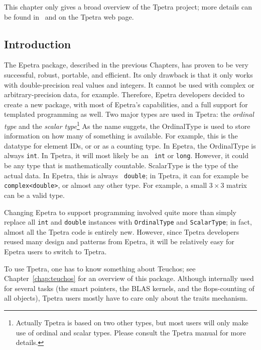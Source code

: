 This chapter only gives a broad overview of the Tpetra project; more details
can be found in~\cite{tpetra_overview} and on the Tpetra web page.

\subsection{Introduction}
\label{sec:tpetra_introduction}

The Epetra package, described in the previous Chapters, has proven to be very
successful, robust, portable, and efficient. Its only drawback is that it only
works with double-precision real values and integers. It cannot be used with
complex or arbitrary-precision data, for example. Therefore, Epetra developers
decided to create a new package, with most of Epetra's capabilities, and a
full support for templated programming as well. Two major types are used in
Tpetra: the {\sl ordinal type} and the {\sl scalar type}\footnote{Actually
Tpetra is based on two other types, but most users will only make  use of
ordinal and scalar types. Please consult the Tpetra manual for more
details.} As the 
name suggets, the OrdinalType is used to store information on how many of
something is available. For example,
this is the datatype for element IDs, or or as a counting type. In Epetra, the
  OrdinalType is always {\tt int}. In Tpetra, it will most likely be an {\tt
    int} or {\tt long}. However, it could be any type that is mathematically
    countable.
ScalarType is the type of the actual data. In Epetra, this is always {\tt
  double}; in Tpetra, it can for example be {\tt complex<double>}, or almost
  any other type. For example, a small $3 \times 3$ matrix can be a valid
  type.

\begin{remark}
Changing Epetra to support programming involved quite more than
simply replace all {\tt int} and {\tt double} instances with {\tt OrdinalType}
and {\tt ScalarType}; in fact, almost all the Tpetra code is entirely new.
However, since Tpetra developers reused many design and patterns from Epetra,
  it will be relatively easy for Epetra users to switch to Tpetra.
\end{remark}

To use Tpetra, one has to know something about Teuchos; see
Chapter~\ref{chap:teuchos} for an overview of this package. Although
internally used for several tasks (the smart pointers, the BLAS kernels, and
the flops-counting of all objects), Tpetra users mostly have to
care only about the traits mechanism.

